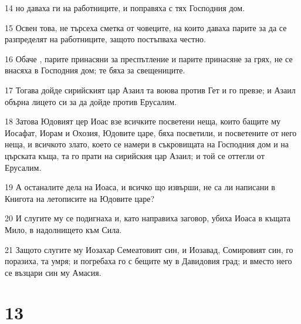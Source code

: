 \par 14 но даваха ги на работниците, и поправяха с тях Господния дом.
\par 15 Освен това, не търсеха сметка от човеците, на които даваха парите за да се разпределят на работниците, защото постъпваха честно.
\par 16 Обаче , парите принасяни за преспътление и парите принасяне за грях, не се внасяха в Господния дом; те бяха за свещениците.
\par 17 Тогава дойде сирийският цар Азаил та воюва против Гет и го превзе; и Азаил обърна лицето си за да дойде против Ерусалим.
\par 18 Затова Юдовият цер Иоас взе всичките посветени неща, които бащите му Иосафат, Иорам и Охозия, Юдовите царе, бяха посветили, и посветените от него неща, и всичкото злато, което се намери в съкровищата на Господния дом и на църската къща, та го прати на сирийския цар Азаил; и той се оттегли от Ерусалим.
\par 19 А останалите дела на Иоаса, и всичко що извърши, не са ли написани в Книгота на летописите на Юдовите царе?
\par 20 И слугите му се подигнаха и, като направиха заговор, убиха Иоаса в къщата Мило, в надолнището към Сила.
\par 21 Защото слугите му Иозахар Семеатовият син, и Иозавад, Сомировият син, го поразиха, та умря; и погребаха го с бещите му в Давидовия град; и вместо него се възцари син му Амасия.

\chapter{13}


